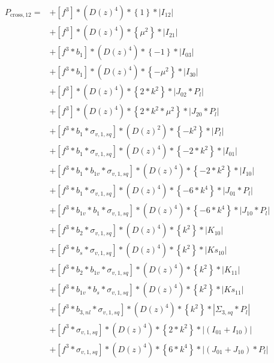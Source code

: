 \documentclass{article}
\begin{document}
\begin{equation}
\begin{aligned} 
P_{\mathrm{cross},12}=
&+\left[f^{3}\right]*\left(D(z)^{4}\right)*\left\{1\right\}*\left|I_{12}\right| \\
&+\left[f^{3}\right]*\left(D(z)^{4}\right)*\left\{\mu^{2}\right\}*\left|I_{21}\right| \\
&+\left[f^{3}*b_{1}\right]*\left(D(z)^{4}\right)*\left\{-1\right\}*\left|I_{03}\right| \\
&+\left[f^{3}*b_{1}\right]*\left(D(z)^{4}\right)*\left\{-\mu^{2}\right\}*\left|I_{30}\right| \\
&+\left[f^{3}\right]*\left(D(z)^{4}\right)*\left\{2*k^{2}\right\}*\left|J_{02}*P_l\right| \\
&+\left[f^{3}\right]*\left(D(z)^{4}\right)*\left\{2*k^{2}*\mu^{2}\right\}*\left|J_{20}*P_l\right| \\
&+\left[f^{3}*b_{1}*\sigma_{v,1,sq}\right]*\left(D(z)^{2}\right)*\left\{-k^{2}\right\}*\left|P_l\right| \\
&+\left[f^{3}*b_{1}*\sigma_{v,1,sq}\right]*\left(D(z)^{4}\right)*\left\{-2*k^{2}\right\}*\left|I_{01}\right| \\
&+\left[f^{3}*b_{1}*b_{1v}*\sigma_{v,1,sq}\right]*\left(D(z)^{4}\right)*\left\{-2*k^{2}\right\}*\left|I_{10}\right| \\
&+\left[f^{3}*b_{1}*\sigma_{v,1,sq}\right]*\left(D(z)^{4}\right)*\left\{-6*k^{4}\right\}*\left|J_{01}*P_l\right| \\
&+\left[f^{3}*b_{1v}*b_{1}*\sigma_{v,1,sq}\right]*\left(D(z)^{4}\right)*\left\{-6*k^{4}\right\}*\left|J_{10}*P_l\right| \\
&+\left[f^{3}*b_{2}*\sigma_{v,1,sq}\right]*\left(D(z)^{4}\right)*\left\{k^{2}\right\}*\left|K_{10}\right| \\
&+\left[f^{3}*b_{s}*\sigma_{v,1,sq}\right]*\left(D(z)^{4}\right)*\left\{k^{2}\right\}*\left|Ks_{10}\right| \\
&+\left[f^{3}*b_{2}*b_{1v}*\sigma_{v,1,sq}\right]*\left(D(z)^{4}\right)*\left\{k^{2}\right\}*\left|K_{11}\right| \\
&+\left[f^{3}*b_{1v}*b_{s}*\sigma_{v,1,sq}\right]*\left(D(z)^{4}\right)*\left\{k^{2}\right\}*\left|Ks_{11}\right| \\
&+\left[f^{3}*b_{3,nl}*\sigma_{v,1,sq}\right]*\left(D(z)^{4}\right)*\left\{k^{2}\right\}*\left|\Sigma_{3,sq}*P_l\right| \\
&+\left[f^{3}*\sigma_{v,1,sq}\right]*\left(D(z)^{4}\right)*\left\{2*k^{2}\right\}*\left|(I_{01}+I_{10})\right| \\
&+\left[f^{3}*\sigma_{v,1,sq}\right]*\left(D(z)^{4}\right)*\left\{6*k^{4}\right\}*\left|(J_{01}+J_{10})*P_l\right| \\
\end{aligned}
\end{equation}
\end{document}
